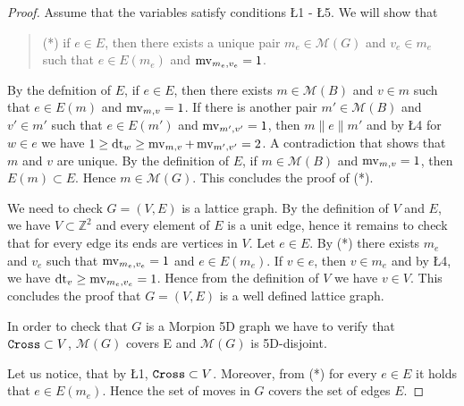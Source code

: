 \begin{proof}  
 Assume that the variables satisfy conditions \L{1} - \L{5}.
  We will show that
  \begin{quote}
  (*) if $e \in E$, then there exists a unique pair $m_e \in \mathcal{M}(G)$ and $v_e \in m_e$ such that $e \in E(m_e)$ and $\operatorname{mv}_{m_e, v_e} = 1$. 
  \end{quote}
  By the defnition of $E$, if $e \in E$, then there exists $m \in \mathcal{M}(B)$ and $v \in m$ such that
    $e \in E(m)$ and $\operatorname{mv}_{m, v} = 1$. If there is another pair $m' \in \mathcal{M}(B)$ and $v' \in m'$ such 
    that $e \in E(m')$ and $\operatorname{mv}_{m', v'} = 1$, then $m \parallel e \parallel m'$ and by \L{4} for $w \in e$ we have
    $1 \geq \operatorname{dt}_w \geq \operatorname{mv}_{m, v} + \operatorname{mv}_{m', v'} = 2$. A contradiction that shows that $m$ and $v$ are unique.
  By the definition of $E$, if $m \in \mathcal{M}(B)$ and  $\operatorname{mv}_{m, v} = 1$, then $E(m) \subset E$. Hence
    $m \in \mathcal{M}(G)$.
  This concludes the proof of (*).

  We need to check $G = (V, E)$ is a lattice graph.
  By the definition of $V$ and $E$, we have $V \subset \mathbb{Z}^2$ and every element of $E$ is a unit edge, hence it remains 
to check that for every edge its ends are vertices in $V$.
  Let $e \in E$. By (*) there exists $m_e$ and $v_e$ such that $\operatorname{mv}_{m_e, v_e} = 1$ and $e \in E(m_e)$.
  If $v \in e$, then $v \in m_e$ and by \L{4}, we have $\operatorname{dt}_v \geq \operatorname{mv}_{m_e, v_e} = 1$. Hence from the definition of $V$ we have
$v \in V$. This concludes the proof that 
$G = (V, E)$ is a well defined lattice graph.
  
In order to check that $G$ is a Morpion 5D graph we have to verify that $\texttt{Cross} \subset V$, ${\mathcal M}(G)$ covers E
and ${\mathcal M}(G)$ is 5D-disjoint.

Let us notice, that by \L{1}, $\texttt{Cross} \subset V$. Moreover, from (*) for every $e \in E$ it holds that $e \in E(m_e)$. 
Hence the set of moves in $G$ covers the set of edges $E$.


\end{proof}
